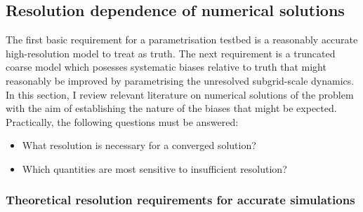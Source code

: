 \documentclass[../main.tex]{subfiles}
\begin{document}
\subsection{Resolution dependence of numerical solutions}

The first basic requirement for a parametrisation testbed is a reasonably
accurate high-resolution model to treat as truth. The next requirement is a
truncated coarse model which posesses systematic biases relative to truth that
might reasonably be improved by parametrising the unresolved subgrid-scale
dynamics. In this section, I review relevant literature on numerical solutions
of the \rb{} problem with the aim of establishing the nature of the biases that
might be expected. Practically, the following questions must be answered:
\begin{itemize}
    \item What resolution is necessary for a converged solution?
    \item Which quantities are most sensitive to insufficient resolution?
\end{itemize}


\subsubsection{Theoretical resolution requirements for accurate simulations}%
\label{sec:res_requirements}
\end{document}
